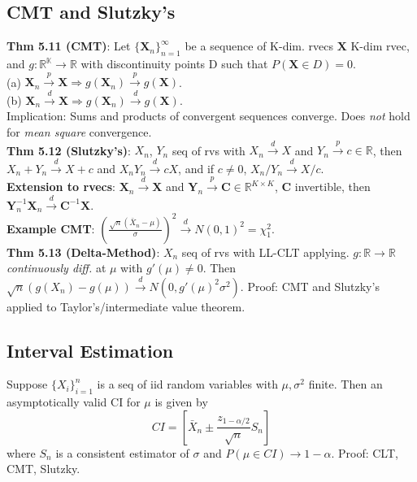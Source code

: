 \subsection{CMT and Slutzky's}
\textbf{Thm 5.11 (CMT)}: Let $\{\textbf{X}_n\}_{n=1}^\infty$ be a sequence of K-dim. rvecs $\textbf{X}$ K-dim rvec, and $g:\mathbb{R^K}\to\mathbb{R}$ with discontinuity points D such that $P(\textbf{X}\in D)=0$. \\
(a) $\textbf{X}_n \xrightarrow{p} \textbf{X} \Rightarrow g(\textbf{X}_n) \xrightarrow{p} g(\textbf{X})$.\\
(b) $\textbf{X}_n \xrightarrow{d} \textbf{X} \Rightarrow g(\textbf{X}_n) \xrightarrow{d} g(\textbf{X})$. \\
Implication: Sums and products of convergent sequences converge. Does \emph{not} hold for \emph{mean square} convergence.\\
\textbf{Thm 5.12 (Slutzky's)}: $X_n$, $Y_n$ seq of rvs with $X_n\xrightarrow{d} X$ and $Y_n\xrightarrow{p} c\in \mathbb{R}$, then $X_n + Y_n \xrightarrow{d} X + c$ and $X_nY_n\xrightarrow{d}cX$, and if $c\neq0$, $X_n/Y_n \xrightarrow{d} X/c$. \\
\textbf{Extension to rvecs}: $\textbf{X}_n \xrightarrow{d} \textbf{X}$ and $\textbf{Y}_n\xrightarrow{p}\textbf{C}\in\mathbb{R}^{K\times K}$, $\textbf{C}$ invertible, then $\textbf{Y}_n^{-1}\textbf{X}_n\xrightarrow{d}\textbf{C}^{-1}\textbf{X}$. \\
\textbf{Example CMT}: $\left(\frac{\sqrt{n}(\bar{X}_n - \mu)}{\sigma}\right)^2 \xrightarrow{d} N(0,1)^2 = \chi_1^2$.\\
\textbf{Thm 5.13 (Delta-Method)}: $X_n$ seq of rvs with LL-CLT applying. $g:\mathbb{R}\to\mathbb{R}$ \emph{continuously diff.} at $\mu$ with $g'(\mu)\neq0$. Then $\sqrt{n}(g(X_n)-g(\mu)) \xrightarrow{d} N(0, g'(\mu)^2\sigma^2)$. Proof: CMT and Slutzky's applied to Taylor's/intermediate value theorem. 

\subsection{Interval Estimation}
Suppose $\{X_i\}_{i=1}^n$ is a seq of iid random variables with $\mu, \sigma^2$ finite. Then an asymptotically valid CI for $\mu$ is given by 
\begin{equation*}
	CI = \left[\bar{X}_n \pm \frac{z_{1-\alpha/2}}{\sqrt{n}}S_n\right]
\end{equation*}
where $S_n$ is a consistent estimator of $\sigma$ and $P(\mu\in CI) \to 1-\alpha$. Proof: CLT, CMT, Slutzky. 

